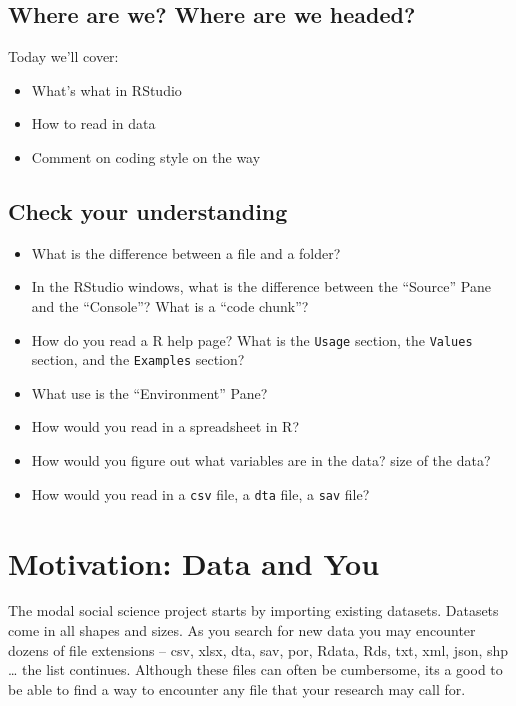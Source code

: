 \documentclass[]{book}
\providecommand{\tightlist}{%
  \setlength{\itemsep}{0pt}\setlength{\parskip}{0pt}}
\theoremstyle{definition}
\theoremstyle{definition}
\theoremstyle{definition}
\theoremstyle{remark}
\begin{document}
\hypertarget{where-are-we-where-are-we-headed}{%
\subsection*{Where are we? Where are we headed?}\label{where-are-we-where-are-we-headed}}

Today we'll cover:

\begin{itemize}
\tightlist
\item
  What's what in RStudio
\item
  How to read in data
\item
  Comment on coding style on the way
\end{itemize}

\hypertarget{check-your-understanding}{%
\subsection*{Check your understanding}\label{check-your-understanding}}

\begin{itemize}
\tightlist
\item
  What is the difference between a file and a folder?
\item
  In the RStudio windows, what is the difference between the ``Source'' Pane and the ``Console''? What is a ``code chunk''?
\item
  How do you read a R help page? What is the \texttt{Usage} section, the \texttt{Values} section, and the \texttt{Examples} section?
\item
  What use is the ``Environment'' Pane?
\item
  How would you read in a spreadsheet in R?
\item
  How would you figure out what variables are in the data? size of the data?
\item
  How would you read in a \texttt{csv} file, a \texttt{dta} file, a \texttt{sav} file?
\end{itemize}

\hypertarget{motivation-data-and-you}{%
\section{Motivation: Data and You}\label{motivation-data-and-you}}

The modal social science project starts by importing existing datasets. Datasets come in all shapes and sizes. As you search for new data you may encounter dozens of file extensions -- csv, xlsx, dta, sav, por, Rdata, Rds, txt, xml, json, shp \ldots{} the list continues. Although these files can often be cumbersome, its a good to be able to find a way to encounter any file that your research may call for.
\end{document}
